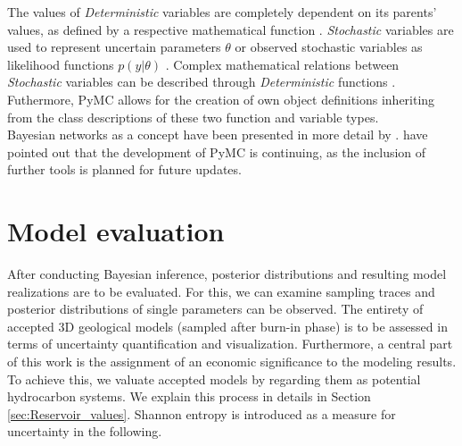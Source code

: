 		The values of \textit{Deterministic} variables are completely dependent on its parents' values, as defined by a respective mathematical function \citep{salvatier2016pymc3}. \textit{Stochastic} variables are used to represent uncertain parameters $\theta$ or observed stochastic variables as likelihood functions $p(y|\theta)$ \citep{salvatier2016pymc3, delaVarga2016}. Complex mathematical relations between \textit{Stochastic} variables can be described through \textit{Deterministic} functions \citep{delaVarga2016}. Futhermore, PyMC allows for the creation of own object definitions inheriting from the class descriptions of these two function and variable types.\\
		Bayesian networks as a concept have been presented in more detail by \citet{koller2009probabilistic}. \citet{salvatier2016pymc3} have pointed out that the development of PyMC is continuing, as the inclusion of further tools is planned for future updates.
		
		
		\section{Model evaluation}\label{sec:model_evaluation}
        After conducting Bayesian inference, posterior distributions and resulting model realizations are to be evaluated. For this, we can examine sampling traces and posterior distributions of single parameters can be observed. The entirety of accepted 3D geological models (sampled after burn-in phase) is to be assessed in terms of uncertainty quantification and visualization. Furthermore, a central part of this work is the assignment of an economic significance to the modeling results. To achieve this, we valuate accepted models by regarding them as potential hydrocarbon systems. We explain this process in details in Section \ref{sec:Reservoir_values}. Shannon entropy is introduced as a measure for uncertainty in the following.
        
